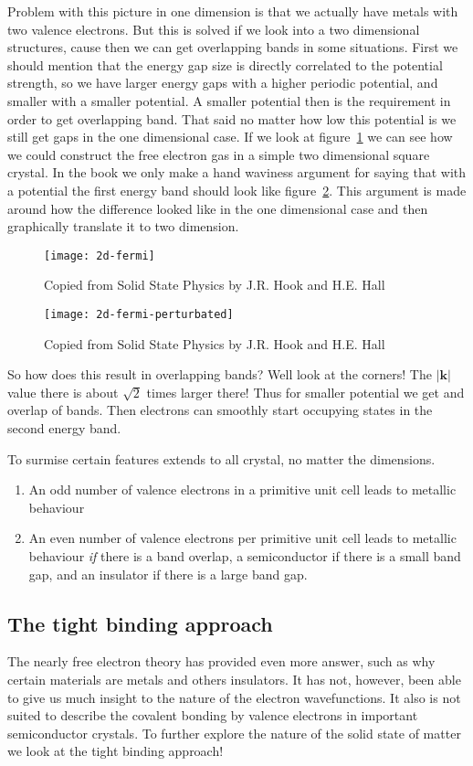 \documentclass[11pt]{article}
\begin{document}
Problem with this picture in one dimension is that we actually have metals with two valence electrons. But this is solved if we look into a two dimensional structures, cause then we can get overlapping bands in some situations. First we should mention that the energy gap size is directly correlated to the potential strength, so we have larger energy gaps with a higher periodic potential, and smaller with a smaller potential. A smaller potential then is the requirement in order to get overlapping band. That said no matter how low this potential is we still get gaps in the one dimensional case. If we look at figure~\ref{fig:2d-fermi} we can see how we could construct the free electron gas in a simple two dimensional square crystal. In the book we only make a hand waviness argument for saying that with a potential the first energy band should look like figure~\ref{fig:2d-fermi-perturbated}. This argument is made around how the difference looked like in the one dimensional case and then graphically translate it to  two dimension. 
\begin{figure}[!ht]
	\centering
	\texttt{[image: 2d-fermi]}
	\caption{Copied from Solid State Physics by J.R. Hook and H.E. Hall}
	\label{fig:2d-fermi}
\end{figure}
\begin{figure}[!ht]
	\centering
	\texttt{[image: 2d-fermi-perturbated]}
	\caption{Copied from Solid State Physics by J.R. Hook and H.E. Hall}
	\label{fig:2d-fermi-perturbated}
\end{figure}
\newpage
So how does this result in overlapping bands? Well look at the corners! The $|\pmb{k}|$ value there is about $\sqrt{2}$ times larger there! Thus for smaller potential we get and overlap of bands. Then electrons can smoothly start occupying states in the second energy band.

To surmise certain features extends to all crystal, no matter the dimensions.
\begin{enumerate}
	\item An odd number of valence electrons in a primitive unit cell leads to metallic behaviour
	\item An even number of valence electrons per primitive unit cell leads to metallic behaviour \emph{if} there is a band overlap, a semiconductor if there is a small band gap, and an insulator if there is a large band gap.
\end{enumerate}

\subsection{The tight binding approach}
The nearly free electron theory has provided even more answer, such as why certain materials are metals and others insulators. It has not, however, been able to give us much insight to the nature of the electron wavefunctions. It also is not suited to describe the covalent bonding by valence electrons in important semiconductor crystals. To further explore the nature of the solid state of matter we look at the tight binding approach!
\end{document}
